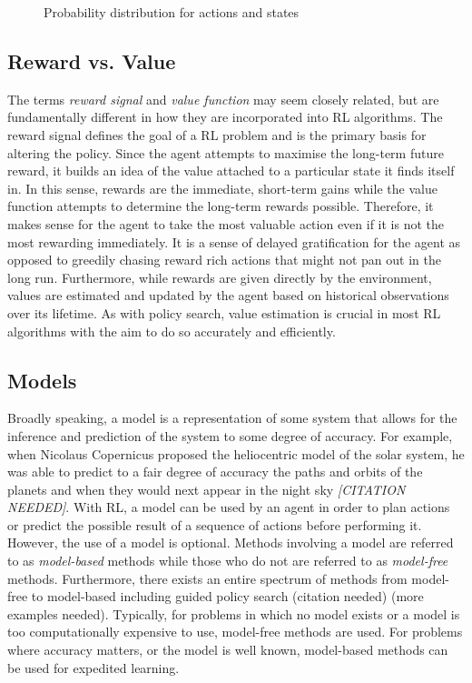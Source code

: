 \documentclass[12pt,notitlepage]{article}
\begin{document}
\begin{figure}[ht]
    \centering
    \def\svgwidth{0.5\columnwidth}
    
    \caption{Probability distribution for actions and states}\label{fig:stochasticpolicyvis}
\end{figure}

\subsection{Reward vs. Value}

The terms \emph{reward signal} and \emph{value function} may seem closely
related, but are fundamentally different in how they are incorporated into RL
algorithms. The reward signal defines the goal of a RL problem and is the
primary basis for altering the policy. Since the agent attempts to maximise the
long-term future reward, it builds an idea of the value attached to a
particular state it finds itself in. In this sense, rewards are the immediate,
short-term gains while the value function attempts to determine the long-term
rewards possible. Therefore, it makes sense for the agent to take the most
valuable action even if it is not the most rewarding immediately. It is a sense
of delayed gratification for the agent as opposed to greedily chasing reward
rich actions that might not pan out in the long run. Furthermore, while rewards
are given directly by the environment, values are estimated and updated by the
agent based on historical observations over its lifetime. As with policy
search, value estimation is crucial in most RL algorithms with the aim to do so
accurately and efficiently.

\subsection{Models}

Broadly speaking, a model is a representation of some system that allows for
the inference and prediction of the system to some degree of accuracy. For
example, when Nicolaus Copernicus proposed the heliocentric model of the solar
system, he was able to predict to a fair degree of accuracy the paths and
orbits of the planets and when they would next appear in the night sky
\emph{[CITATION NEEDED]}. With RL, a model can be used by an agent in order to
plan actions or predict the possible result of a sequence of actions before
performing it. However, the use of a model is optional. Methods involving a
model are referred to as \emph{model-based} methods while those who do not are
referred to as \emph{model-free} methods. Furthermore, there exists an entire
spectrum of methods from model-free to model-based including guided policy
search (citation needed) (more examples needed). Typically, for problems in
which no model exists or a model is too computationally expensive to use,
model-free methods are used. For problems where accuracy matters, or the model
is well known, model-based methods can be used for expedited learning.




\appendix

%
%

\glsaddall

\printglossary[nonumberlist]
\end{document}
